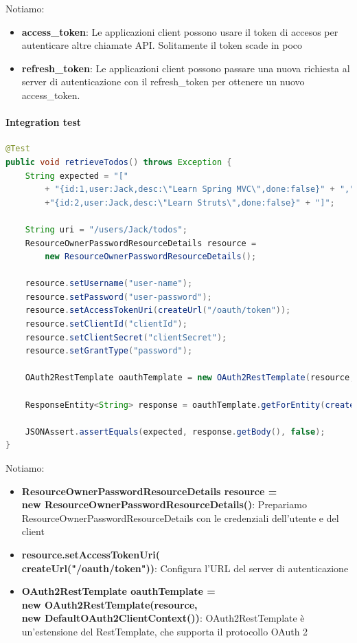 \documentclass[11pt,a4paper]{book}
\begin{document}
Notiamo:
\begin{itemize}
	\item \textbf{access\_token}: Le applicazioni client possono usare il token di accesos per autenticare altre chiamate API. Solitamente il token scade in poco
	\item \textbf{refresh\_token}: Le applicazioni client possono passare una nuova richiesta al server di autenticazione con il refresh\_token per ottenere un nuovo access\_token.
\end{itemize}

\paragraph{Integration test}
\begin{lstlisting}[language = Java]
@Test
public void retrieveTodos() throws Exception {
	String expected = "["
		+ "{id:1,user:Jack,desc:\"Learn Spring MVC\",done:false}" + ","
		+"{id:2,user:Jack,desc:\"Learn Struts\",done:false}" + "]";
	
	String uri = "/users/Jack/todos";
	ResourceOwnerPasswordResourceDetails resource =
		new ResourceOwnerPasswordResourceDetails();

	resource.setUsername("user-name");
	resource.setPassword("user-password");
	resource.setAccessTokenUri(createUrl("/oauth/token"));
	resource.setClientId("clientId");
	resource.setClientSecret("clientSecret");
	resource.setGrantType("password");

	OAuth2RestTemplate oauthTemplate = new OAuth2RestTemplate(resource,new DefaultOAuth2ClientContext());
	
	ResponseEntity<String> response = oauthTemplate.getForEntity(createUrl(uri), String.class);
	
	JSONAssert.assertEquals(expected, response.getBody(), false);
}
\end{lstlisting}

Notiamo:
\begin{itemize}
	\item \textbf{ResourceOwnerPasswordResourceDetails resource = \\
	new ResourceOwnerPasswordResourceDetails()}: Prepariamo ResourceOwnerPasswordResourceDetails con le credenziali dell'utente e del client
	\item \textbf{resource.setAccessTokenUri(\\
		createUrl("/oauth/token"))}: Configura l'URL del server di autenticazione	
	\item \textbf{OAuth2RestTemplate oauthTemplate = \\
		new OAuth2RestTemplate(resource, \\
		new DefaultOAuth2ClientContext())}: OAuth2RestTemplate è un'estensione del RestTemplate, che supporta il protocollo OAuth 2
\end{itemize}
\end{document}
